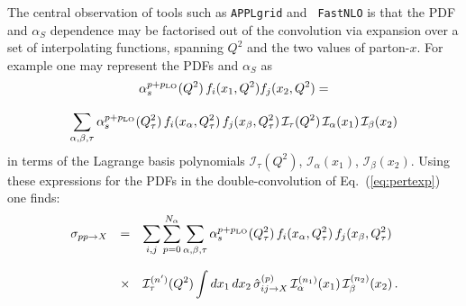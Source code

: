 \documentclass[preprint,12pt]{elsarticle}
\begin{document}
The central observation of tools such as {\tt APPLgrid} and {\tt
  FastNLO} is that the PDF and $\alpha_S$ dependence may be factorised out of
  the convolution via expansion over a set of interpolating functions, spanning $Q^2$ and the
  two values of parton-$x$. For example one may represent the PDFs and $\alpha_S$ as
\begin{equation}\label{eq:interpolation}
\begin{array}{c}
\displaystyle \alpha_s^{p+p_{\rm LO}}(Q^2) \,f_i(x_1,Q^2) f_j(x_2,Q^2)
  =\\
\\
\displaystyle \sum_{\alpha,\beta,\tau} \alpha_s^{p+p_{\rm LO}}(Q_\tau^2)
  \,f_i(x_\alpha,Q_\tau^2)\,f_j(x_\beta,Q_\tau^2)
  \,\mathcal{I}_\tau(Q^2)\,\mathcal{I}_\alpha(x_1)
  \,\mathcal{I}_\beta(x_2)
\end{array}
\end{equation}
in terms of the Lagrange basis polynomials $\mathcal{I}_\tau(Q^2)$,
$\mathcal{I}_\alpha(x_1)$, $\mathcal{I}_\beta(x_2)$.
Using these expressions for the PDFs in the double-convolution of Eq.~(\ref{eq:pertexp}) one finds:
\begin{equation}\label{eq:XsecPDFs}
\begin{array}{rcl}
  \displaystyle \sigma_{pp\to X} &=& \displaystyle 
                                     \sum_{i,j}\sum_{p=0}^{N_\alpha} \sum_{\alpha,\beta,\tau} \alpha_s^{p+p_{\rm LO}}(Q_\tau^2)
                                     \,f_i(x_\alpha,Q_\tau^2)\,f_j(x_\beta,Q_\tau^2)\\
  \\
                                 &\times& \displaystyle \mathcal{I}_\tau^{(n')}(Q^2)\int dx_1\,dx_2\,
                                          \hat{\sigma}^{(p)}_{ij\to X}\,\mathcal{I}_\alpha^{(n_1)}(x_1)
                                          \,\mathcal{I}_\beta^{(n_2)}(x_2)\,.
\end{array}
\end{equation}
\end{document}
